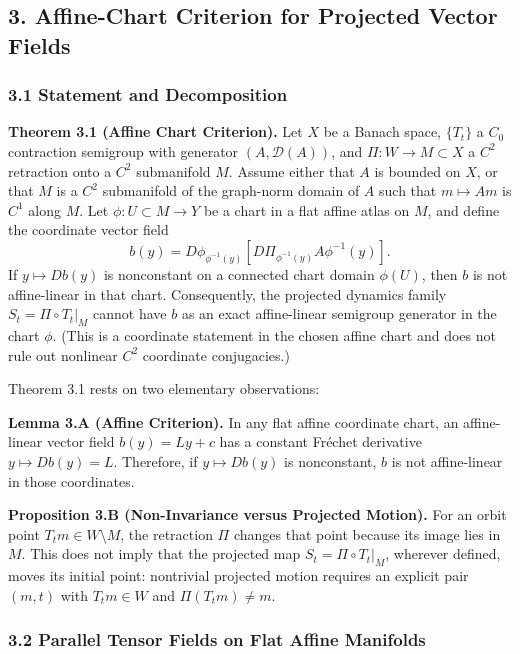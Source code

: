 \documentclass[
  11pt,
]{article}
\begin{document}
\subsection{3. Affine-Chart Criterion for Projected Vector Fields}\label{affine-chart-criterion-for-projected-vector-fields}

\subsubsection{3.1 Statement and Decomposition}\label{statement-and-decomposition}

\textbf{Theorem 3.1 (Affine Chart Criterion).} Let \(X\) be a Banach space, \(\{T_t\}\) a \(C_0\) contraction semigroup with generator \((A,\mathcal D(A))\), and \(\Pi:W\to M\subset X\) a \(C^2\) retraction onto a \(C^2\) submanifold \(M\). Assume either that \(A\) is bounded on \(X\), or that \(M\) is a \(C^2\) submanifold of the graph-norm domain of \(A\) such that \(m\mapsto Am\) is \(C^1\) along \(M\). Let \(\phi:U\subset M\to Y\) be a chart in a flat affine atlas on \(M\), and define the coordinate vector field
\[
b(y)=D\phi_{\phi^{-1}(y)}\left[D\Pi_{\phi^{-1}(y)}A\phi^{-1}(y)\right].
\]
If \(y\mapsto Db(y)\) is nonconstant on a connected chart domain \(\phi(U)\), then \(b\) is not affine-linear in that chart. Consequently, the projected dynamics family \(S_t=\Pi\circ T_t|_M\) cannot have \(b\) as an exact affine-linear semigroup generator in the chart \(\phi\). (This is a coordinate statement in the chosen affine chart and does not rule out nonlinear \(C^2\) coordinate conjugacies.)

Theorem 3.1 rests on two elementary observations:

\textbf{Lemma 3.A (Affine Criterion).} In any flat affine coordinate chart, an affine-linear vector field \(b(y)=Ly+c\) has a constant Fréchet derivative \(y\mapsto Db(y)=L\). Therefore, if \(y\mapsto Db(y)\) is nonconstant, \(b\) is not affine-linear in those coordinates.

\textbf{Proposition 3.B (Non-Invariance versus Projected Motion).} For an orbit point \(T_tm\in W\setminus M\), the retraction \(\Pi\) changes that point because its image lies in \(M\). This does not imply that the projected map \(S_t=\Pi\circ T_t|_M\), wherever defined, moves its initial point: nontrivial projected motion requires an explicit pair \((m,t)\) with \(T_tm\in W\) and \(\Pi(T_tm)\ne m\).

\subsubsection{3.2 Parallel Tensor Fields on Flat Affine Manifolds}\label{parallel-tensor-fields-on-flat-affine-manifolds}
\end{document}
